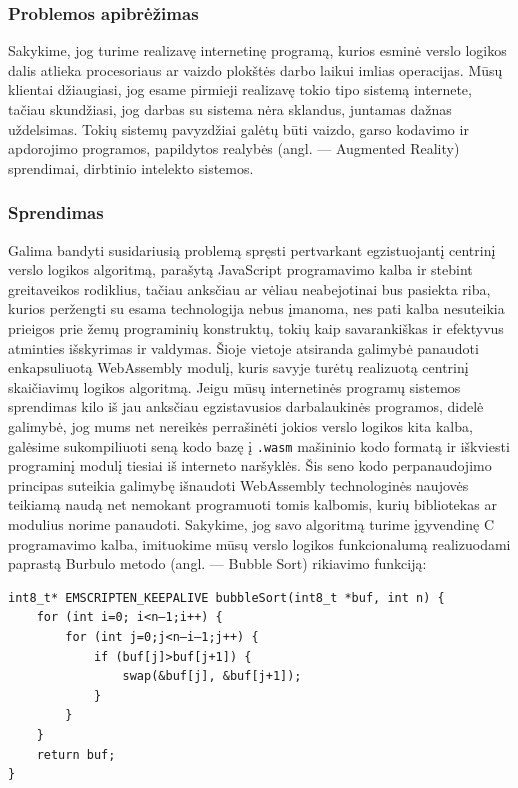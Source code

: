 \documentclass{VUMIFPSkursinis}
\begin{document}
\subsubsection{Problemos apibrėžimas}
Sakykime, jog turime realizavę internetinę programą, kurios esminė verslo logikos dalis atlieka procesoriaus ar vaizdo plokštės darbo laikui imlias operacijas. Mūsų klientai džiaugiasi, jog esame pirmieji realizavę tokio tipo sistemą internete, tačiau skundžiasi, jog darbas su sistema nėra sklandus, juntamas dažnas uždelsimas. Tokių sistemų pavyzdžiai galėtų būti vaizdo, garso kodavimo ir apdorojimo programos, papildytos realybės (angl. — Augmented Reality) sprendimai, dirbtinio intelekto sistemos. 
\subsubsection{Sprendimas}
Galima bandyti susidariusią problemą spręsti pertvarkant egzistuojantį centrinį verslo logikos algoritmą, parašytą JavaScript programavimo kalba ir stebint greitaveikos rodiklius, tačiau anksčiau ar vėliau neabejotinai bus pasiekta riba, kurios peržengti su esama technologija nebus įmanoma, nes pati kalba nesuteikia prieigos prie žemų programinių konstruktų, tokių kaip savarankiškas ir efektyvus atminties išskyrimas ir valdymas. 
Šioje vietoje atsiranda galimybė panaudoti enkapsuliuotą WebAssembly modulį, kuris savyje turėtų realizuotą centrinį skaičiavimų logikos algoritmą. Jeigu mūsų internetinės programų sistemos sprendimas kilo iš jau anksčiau egzistavusios darbalaukinės programos, didelė galimybė, jog mums net nereikės perrašinėti jokios verslo logikos kita kalba, galėsime sukompiliuoti seną kodo bazę į \verb|.wasm| mašininio kodo formatą ir iškviesti programinį modulį tiesiai iš interneto naršyklės. Šis seno kodo perpanaudojimo principas suteikia galimybę išnaudoti WebAssembly technologinės naujovės teikiamą naudą net nemokant programuoti tomis kalbomis, kurių bibliotekas ar modulius norime panaudoti. Sakykime, jog savo algoritmą turime įgyvendinę C programavimo kalba, imituokime mūsų verslo logikos funkcionalumą realizuodami paprastą Burbulo metodo (angl. — Bubble Sort) rikiavimo funkciją:

\begin{center}
\begin{small}
\begin{verbatim}
int8_t* EMSCRIPTEN_KEEPALIVE bubbleSort(int8_t *buf, int n) {
    for (int i=0; i<n—1;i++) {
        for (int j=0;j<n—i—1;j++) {
            if (buf[j]>buf[j+1]) {
                swap(&buf[j], &buf[j+1]);
            }
        }
    }
    return buf;
}
\end{verbatim}
\end{small}
\end{center}
\end{document}
